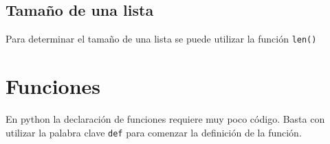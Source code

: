 \begin{Shaded}
\begin{Highlighting}[]
\OperatorTok{=}\NormalTok{ [}\NormalTok{, }\NormalTok{, }\NormalTok{, }\NormalTok{, }\NormalTok{, }
            \NormalTok{, }\NormalTok{, }\NormalTok{]}
    \NormalTok{(lista[}\NormalTok{:])}
\end{Highlighting}
\end{Shaded}

\subsection{Tamaño de una lista}

Para determinar el tamaño de una lista se puede utilizar la función
\texttt{len()}

\begin{Shaded}
\begin{Highlighting}[]
    \NormalTok{(}
\end{Highlighting}
\end{Shaded}

\section{Funciones}

En python la declaración de funciones requiere muy poco código. Basta
con utilizar la palabra clave \texttt{def} para comenzar la definición
de la función.

\begin{Shaded}
\begin{Highlighting}[]

\end{Highlighting}
\end{Shaded}


